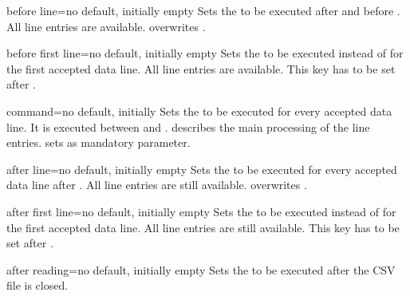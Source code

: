 \documentclass[a4paper,11pt]{ltxdoc}
\begin{document}
\begin{docCsvKey}{before line}{=}{no default, initially empty}
  Sets the  to be executed after 
  and before .
  All line entries are available.
   overwrites
  .
\end{docCsvKey}


\begin{docCsvKey}{before first line}{=}{no default, initially empty}
  Sets the  to be executed instead of 
  for the first accepted data line.
  All line entries are available.
  This key has to be set after .
\end{docCsvKey}

\pagebreak

\begin{docCsvKey}{command}{=}{no default, initially }
  Sets the  to be executed for every accepted data line.
  It is executed between  and .
   describes the main processing of the line
  entries.  sets  as mandatory
  parameter.
\end{docCsvKey}

\begin{docCsvKey}{after line}{=}{no default, initially empty}
  Sets the  to be executed for every accepted data line
  after .
  All line entries are still available.
   overwrites .
\end{docCsvKey}


\begin{docCsvKey}{after first line}{=}{no default, initially empty}
  Sets the  to be executed instead of 
  for the first accepted data line.
  All line entries are still available.
  This key has to be set after .
\end{docCsvKey}

\begin{docCsvKey}{after reading}{=}{no default, initially empty}
  Sets the  to be executed after the CSV file is closed.
\end{docCsvKey}

\bigskip
\end{document}
